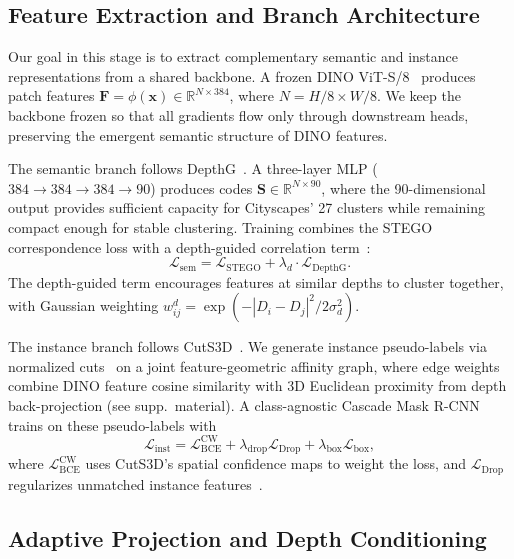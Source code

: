 \documentclass[10pt,twocolumn,letterpaper]{article}
\newcommand{\lsem}{\mathcal{L}_{\text{sem}}}
\newcommand{\linst}{\mathcal{L}_{\text{inst}}}
\begin{document}
\subsection{Feature Extraction and Branch Architecture}
\label{sec:branches}

Our goal in this stage is to extract complementary semantic and instance representations from a shared backbone. A frozen DINO ViT-S/8~\cite{caron2021dino} produces patch features $\mathbf{F} = \phi(\mathbf{x}) \in \mathbb{R}^{N \times 384}$, where $N = H/8 \times W/8$. We keep the backbone frozen so that all gradients flow only through downstream heads, preserving the emergent semantic structure of DINO features.

The semantic branch follows DepthG~\cite{sick2024depthg}. A three-layer MLP ($384 {\to} 384 {\to} 384 {\to} 90$) produces codes $\mathbf{S} \in \mathbb{R}^{N \times 90}$, where the 90-dimensional output provides sufficient capacity for Cityscapes' 27 clusters while remaining compact enough for stable clustering. Training combines the STEGO correspondence loss with a depth-guided correlation term~\cite{sick2024depthg}:
\begin{equation}
\lsem = \mathcal{L}_{\text{STEGO}} + \lambda_d \cdot \mathcal{L}_{\text{DepthG}}.
\label{eq:semantic_loss}
\end{equation}
The depth-guided term encourages features at similar depths to cluster together, with Gaussian weighting $w_{ij}^d = \exp(-|D_i - D_j|^2 / 2\sigma_d^2)$.

The instance branch follows CutS3D~\cite{sick2025cuts3d}. We generate instance pseudo-labels via normalized cuts~\cite{shi2000ncut} on a joint feature-geometric affinity graph, where edge weights combine DINO feature cosine similarity with 3D Euclidean proximity from depth back-projection (see supp.\ material). A class-agnostic Cascade Mask R-CNN~\cite{cai2019cascade} trains on these pseudo-labels with
\begin{equation}
\linst = \mathcal{L}_{\text{BCE}}^{\text{CW}} + \lambda_{\text{drop}} \mathcal{L}_{\text{Drop}} + \lambda_{\text{box}} \mathcal{L}_{\text{box}},
\label{eq:instance_loss}
\end{equation}
where $\mathcal{L}_{\text{BCE}}^{\text{CW}}$ uses CutS3D's spatial confidence maps to weight the loss, and $\mathcal{L}_{\text{Drop}}$ regularizes unmatched instance features~\cite{sick2025cuts3d}.


\subsection{Adaptive Projection and Depth Conditioning}
\label{sec:bridge}
\end{document}
